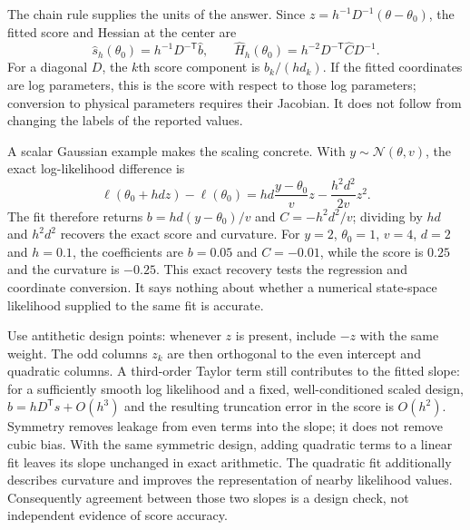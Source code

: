 The chain rule supplies the units of the answer.  Since
$z=h^{-1}D^{-1}(\theta-\theta_0)$, the fitted score and Hessian at the center are
\begin{equation}
  \widehat s_h(\theta_0)=h^{-1}D^{-\mathsf T}\widehat b,
  \qquad
  \widehat H_h(\theta_0)
     =h^{-2}D^{-\mathsf T}\widehat C D^{-1}.
  \label{eq:bf-hd-reference-quadratic-derivatives}
\end{equation}
For a diagonal $D$, the $k$th score component is $\widehat b_k/(hd_k)$.
If the fitted coordinates are log parameters, this is the score with respect to
those log parameters; conversion to physical parameters requires their
Jacobian.  It does not follow from changing the labels of the reported values.

A scalar Gaussian example makes the scaling concrete.  With
$y\sim\mathcal N(\theta,v)$, the exact log-likelihood difference is
\begin{equation}
  \ell(\theta_0+hdz)-\ell(\theta_0)
   =hd\frac{y-\theta_0}{v}z-\frac{h^2d^2}{2v}z^2.
  \label{eq:bf-hd-reference-gaussian-example}
\end{equation}
The fit therefore returns $b=hd(y-\theta_0)/v$ and $C=-h^2d^2/v$;
dividing by $hd$ and $h^2d^2$ recovers the exact score and curvature.
For $y=2$, $\theta_0=1$, $v=4$, $d=2$ and $h=0.1$, the coefficients are
$b=0.05$ and $C=-0.01$, while the score is $0.25$ and the curvature is $-0.25$.
This exact recovery tests the regression and coordinate conversion.  It says
nothing about whether a numerical state-space likelihood supplied to the same
fit is accurate.

Use antithetic design points: whenever $z$ is present, include $-z$ with the
same weight.  The odd columns $z_k$ are then orthogonal to the even intercept
and quadratic columns.  A third-order Taylor term still contributes to the
fitted slope: for a sufficiently smooth log likelihood and a fixed,
well-conditioned scaled design, $\widehat b=hD^\mathsf Ts+O(h^3)$ and the
resulting truncation error in the score is $O(h^2)$.  Symmetry removes leakage
from even terms into the slope; it does not remove cubic bias.  With the same
symmetric design, adding quadratic terms to a linear fit leaves its slope
unchanged in exact arithmetic.  The quadratic fit additionally describes
curvature and improves the representation of nearby likelihood values.
Consequently agreement between those two slopes is a design check, not
independent evidence of score accuracy.

